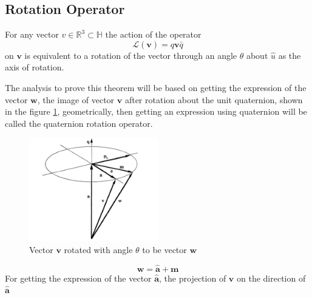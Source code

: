 \subsection{Rotation Operator}
For any vector $v \in\mathbb{R}^3 \subset \mathbb{H}$ the action of the operator
\begin{equation}
    \mathcal{L}(\boldsymbol{v})=q\boldsymbol{v}\bar{q}
\end{equation}
on $\boldsymbol{v}$ is equivalent to a rotation of the vector through an angle $\theta$ about $\hat{u}$ as the axis of rotation.

The analysis to prove this theorem will be based on getting the expression of the vector $\boldsymbol{w}$, the image of vector $\boldsymbol{v}$ after rotation about the unit quaternion, shown in the figure \ref{fig:rot}, geometrically, then getting an expression using quaternion will be called the quaternion rotation operator.
\begin{figure}[H]
    \centering
    \includegraphics[width=0.5\textwidth]{Figures/rot.png}
    \caption{Vector $\boldsymbol{v}$ rotated with angle $\theta$ to be vector $\boldsymbol{w}$}
    \label{fig:rot}
\end{figure}
\begin{equation}
\boldsymbol{w}=\widehat{\boldsymbol{a}}+\boldsymbol{m} 
\end{equation}
For getting the expression of the vector $\boldsymbol{\hat{a}}$, the projection of $\boldsymbol{v}$ on the direction of $\boldsymbol{\hat{a}}$

